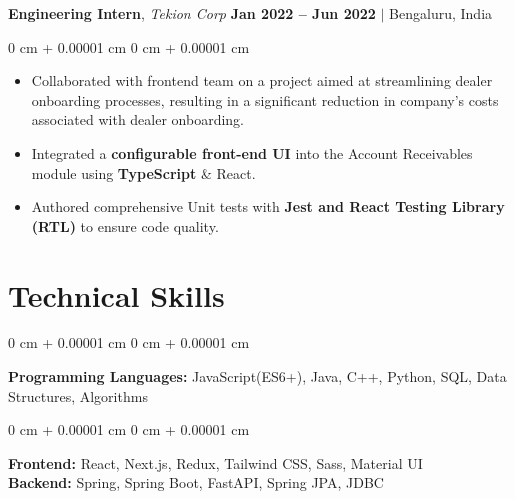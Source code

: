 \documentclass[10pt, letterpaper]{article}
\newenvironment{highlights}{
    \begin{itemize}[
        topsep=0.10 cm,     %
        parsep=0.10 cm,     %
        partopsep=0pt,      %
        itemsep=0pt,        %
        leftmargin=0 cm + 10pt  %
    ]
}{
    \end{itemize}
}
\newenvironment{onecolentry}{
    \begin{adjustwidth}{
        0 cm + 0.00001 cm
    }{
        0 cm + 0.00001 cm
    }
}{
    \end{adjustwidth}
}
\begin{document}
        \vspace{0.3 cm}

        \noindent
        \textbf{Engineering Intern}, {\color{darkgray}\textit{Tekion Corp}} \hfill {\color{darkgray}\small{ \textbf{Jan 2022 – Jun 2022} $|$ Bengaluru, India }}

        \vspace{0.10 cm}
        \begin{onecolentry}
            \begin{highlights}
                \item Collaborated with frontend team on a project aimed at streamlining dealer onboarding processes, resulting in a significant reduction in company's costs associated with dealer onboarding.
                \item Integrated a \textbf{configurable front-end UI} into the Account Receivables module using \textbf{TypeScript} \& React.
                \item Authored comprehensive Unit tests with \textbf{Jest and React Testing Library (RTL)} to ensure code quality.
            \end{highlights}
        \end{onecolentry}


    
    \section{Technical Skills}

        \begin{onecolentry}
        \textbf{Programming Languages:} JavaScript(ES6+), Java, C++, Python, SQL, Data Structures, Algorithms  %
        \end{onecolentry}
        
        \vspace{0.1 cm}
        
        \begin{onecolentry}
        \textbf{Frontend:} React, Next.js, Redux, Tailwind CSS, Sass, Material UI \\  %
        \vspace{0.1 cm}
        \textbf{Backend:} Spring, Spring Boot, FastAPI, Spring JPA, JDBC  %
        \end{onecolentry}
        
\end{document}
